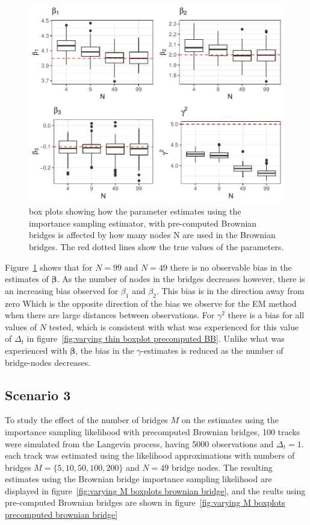 \begin{figure}[H]
    \centering
    \includegraphics[width=\linewidth]{Images/Results/varying N estimates precomputed BB.pdf}
    \caption[Box plots of Parameter Estimates using pre-computed Brownian bridge importance sampling using different numbers of bridge nodes]{box plots showing how the parameter estimates using the importance sampling estimator, with pre-computed Brownian bridges is affected by how many nodes N are used in the Brownian bridges. The red dotted lines show the true values of the parameters.}
    \label{fig: varying N boxplots precomputed brownian bridge}
\end{figure}

Figure~\ref{fig: varying N boxplots precomputed brownian bridge} shows that for $N=99$ and $N=49$ there is no observable bias in the estimates of $\bm \beta$. As the number of nodes in the bridges decreases however, there is an increasing bias observed for $\beta_1$ and $\beta_2$. This bias is in the direction away from zero Which is the opposite direction of the bias we observe for the EM method when there are large distances between observations. For $\gamma^2$ there is a bias for all values of $N$ tested, which is consistent with what was experienced for this value of $\Delta_t$ in figure~\ref{fig:varying thin boxplot precomputed BB}. Unlike what was experienced with $\bm \beta$, the bias in the $\gamma$-estimates is reduced as the number of bridge-nodes decreases.

\subsection{Scenario 3}
To study the effect of the number of bridges $M$ on the estimates using the importance sampling likelihood with precomputed Brownian bridges, 100 tracks were simulated from the Langevin process, having 5000 observations and $\Delta_t = 1$. each track was estimated using the likelihood approximations with numbers of bridges $M=\{5,10,50,100,200\}$ and $N=49$ bridge nodes. The resulting estimates using the Brownian bridge importance sampling likelihood are displayed in figure~\ref{fig:varying M boxplots brownian bridge}, and the reults using pre-computed Brownian bridges are shown in figure~\ref{fig:varying M boxplots precomputed brownian bridge}


